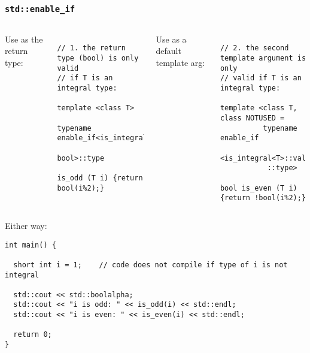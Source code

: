 \begin{frame}[fragile,t]
\frametitle{\texttt{std::enable\_if}}

\begin{columns}[t]

Use as the return type:
{\scriptsize\begin{verbatim}

// 1. the return type (bool) is only valid 
// if T is an integral type:

template <class T> 

typename enable_if<is_integral<T>::value,
                   bool>::type

is_odd (T i) {return bool(i%2);}

\end{verbatim}
}
\pause
{}
Use as a default template arg:
{\scriptsize\begin{verbatim}

// 2. the second template argument is only 
// valid if T is an integral type:

template <class T, class NOTUSED = 
          typename enable_if
             <is_integral<T>::value>
           ::type>

bool is_even (T i) {return !bool(i%2);}
\end{verbatim}
}

\end{columns}
\vskip 12pt
\pause
Either way:
{\scriptsize\begin{verbatim}
int main() {

  short int i = 1;    // code does not compile if type of i is not integral

  std::cout << std::boolalpha;
  std::cout << "i is odd: " << is_odd(i) << std::endl;
  std::cout << "i is even: " << is_even(i) << std::endl;

  return 0;
}

\end{verbatim}
}


\end{frame}
